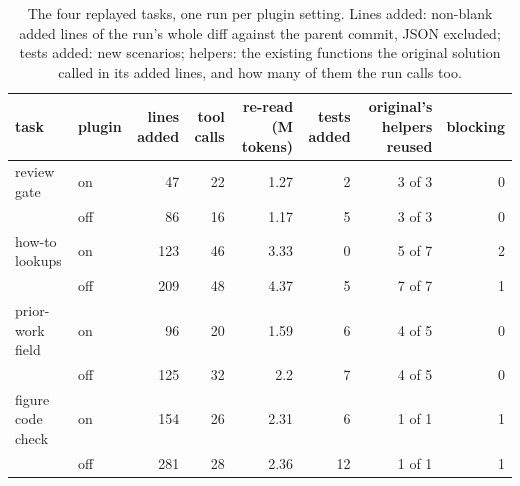 \documentclass[11pt]{article}
\begin{document}
\begin{table}[H]
\centering
\begin{tabular}{llrrrrrr}
task & plugin & lines added & tool calls & re-read (M tokens) & tests added & original's helpers reused & blocking \\
\hline
review gate & on & 47 & 22 & 1.27 & 2 & 3 of 3 & 0 \\
 & off & 86 & 16 & 1.17 & 5 & 3 of 3 & 0 \\
how-to lookups & on & 123 & 46 & 3.33 & 0 & 5 of 7 & 2 \\
 & off & 209 & 48 & 4.37 & 5 & 7 of 7 & 1 \\
prior-work field & on & 96 & 20 & 1.59 & 6 & 4 of 5 & 0 \\
 & off & 125 & 32 & 2.2 & 7 & 4 of 5 & 0 \\
figure code check & on & 154 & 26 & 2.31 & 6 & 1 of 1 & 1 \\
 & off & 281 & 28 & 2.36 & 12 & 1 of 1 & 1 \\
\end{tabular}
\caption{The four replayed tasks, one run per plugin setting. Lines added: non-blank added lines of the run's whole
diff against the parent commit, JSON excluded; tests added: new scenarios; helpers: the existing functions the original
solution called in its added lines, and how many of them the run calls too.}
\label{tab:ponytail_ab}
\end{table}
\end{document}
